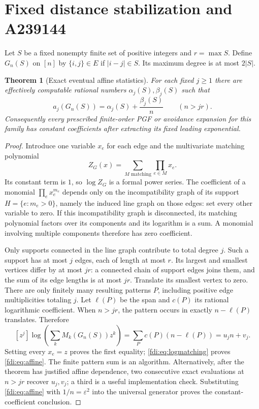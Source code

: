\documentclass[11pt,letterpaper]{article}
\newtheorem{theorem}{Theorem}[section]
\theoremstyle{remark}\newtheorem{remark}[theorem]{Remark}
\newcommand{\eps}{\varepsilon}\newcommand{\Pois}{\operatorname{Poisson}}
\begin{document}
\section{Fixed distance stabilization and A239144}
Let $S$ be a fixed nonempty finite set of positive integers and $r=\max S$. Define $G_n(S)$ on $[n]$ by $\{i,j\}\in E$ if $|i-j|\in S$. Its maximum degree is at most $2|S|$.

\begin{theorem}[Exact eventual affine statistics]\label{fdi:thm:affine}
For each fixed $j\ge1$ there are effectively computable rational numbers $\alpha_j(S),\beta_j(S)$ such that
\begin{equation}\label{fdi:eq:affine}
 a_j(G_n(S))=\alpha_j(S)+\frac{\beta_j(S)}n
 \qquad(n>jr).
\end{equation}
Consequently every prescribed finite-order PGF or avoidance expansion for this family has constant coefficients after extracting its fixed leading exponential.
\end{theorem}
\begin{proof}
Introduce one variable $x_e$ for each edge and the multivariate matching polynomial
\[
 Z_G(x)=\sum_{M\text{ matching}}\prod_{e\in M}x_e.
\]
Its constant term is $1$, so $\log Z_G$ is a formal power series. The coefficient of a monomial $\prod_ex_e^{m_e}$ depends only on the incompatibility graph of its support $H=\{e:m_e>0\}$, namely the induced line graph on those edges: set every other variable to zero. If this incompatibility graph is disconnected, its matching polynomial factors over its components and its logarithm is a sum. A monomial involving multiple components therefore has zero coefficient.

Only supports connected in the line graph contribute to total degree $j$. Such a support has at most $j$ edges, each of length at most $r$. Its largest and smallest vertices differ by at most $jr$: a connected chain of support edges joins them, and the sum of its edge lengths is at most $jr$. Translate its smallest vertex to zero. There are only finitely many resulting patterns $P$, including positive edge multiplicities totaling $j$. Let $\ell(P)$ be the span and $c(P)$ its rational logarithmic coefficient. When $n>jr$, the pattern occurs in exactly $n-\ell(P)$ translates. Therefore
\begin{equation}\label{fdi:eq:clusters}
 [z^j]\log\!\left(\sum_k M_k(G_n(S))z^k\right)
 =\sum_P c(P)(n-\ell(P))=u_jn+v_j.
\end{equation}
Setting every $x_e=z$ proves the first equality; \eqref{fdi:eq:logmatching} proves \eqref{fdi:eq:affine}. The finite pattern sum is an algorithm. Alternatively, after the theorem has justified affine dependence, two consecutive exact evaluations at $n>jr$ recover $u_j,v_j$; a third is a useful implementation check. Substituting \eqref{fdi:eq:affine} with $1/n=\eps^2$ into the universal generator proves the constant-coefficient conclusion.
\end{proof}
\end{document}

